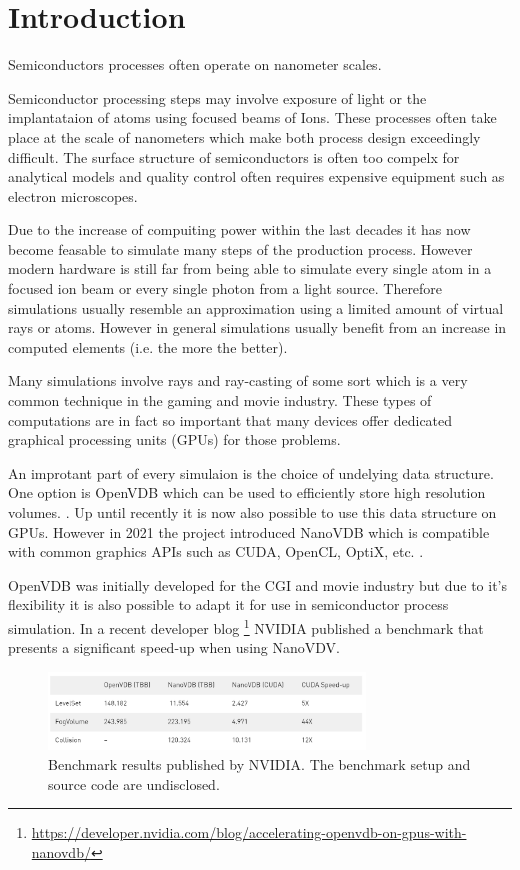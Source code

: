 \section{Introduction}
Semiconductors processes often operate on nanometer scales. 


Semiconductor processing steps may involve exposure of light or the implantataion of atoms using focused beams of Ions.
These processes often take place at the scale of nanometers which make both process design exceedingly difficult.
The surface structure of semiconductors is often too compelx for analytical models and quality control often requires expensive equipment such as electron microscopes.

Due to the increase of compuiting power within the last decades it has now become feasable to simulate many steps of the production process.
However modern hardware is still far from being able to simulate every single atom in a focused ion beam or every single photon from a light source.
Therefore simulations usually resemble an approximation using a limited amount of virtual rays or atoms. 
However in general simulations usually benefit from an increase in computed elements (i.e. the more the better).

Many simulations involve rays and ray-casting of some sort which is a very common technique in the gaming and movie industry.
These types of computations are in fact so important that many devices offer dedicated graphical processing units (GPUs) for those problems.



An improtant part of every simulaion is the choice of undelying data structure. 
One option is OpenVDB which can be used to efficiently store high resolution volumes. \cite{openvdb}.
Up until recently it is now also possible to use this data structure on GPUs.
However in 2021 the project introduced NanoVDB which is compatible with common graphics APIs such as CUDA, OpenCL, OptiX, etc. \cite{nanovdb}.

OpenVDB was initially developed for the CGI and movie industry but due to it's flexibility it is also possible to adapt it for use in semiconductor process simulation.
In a recent developer blog \footnote{\url{https://developer.nvidia.com/blog/accelerating-openvdb-on-gpus-with-nanovdb/}} NVIDIA published a benchmark that
presents a significant speed-up when using NanoVDV.

\begin{figure}[H]
	\centering
	\includegraphics[width=0.75\textwidth]{res/nvidia_benchmark.png}
	\caption{Benchmark results published by NVIDIA. The benchmark setup and source code are undisclosed. \cite{nanovdb_nvidia}}
	\label{fig::nvidia_benchmark}
\end{figure}

